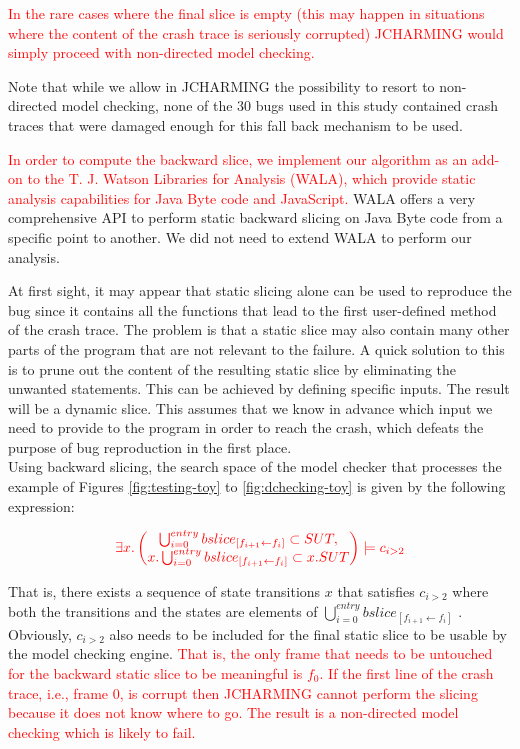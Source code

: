 \documentclass[times, doublespace]{smrauth}
\newcommand{\red}[1]{\textcolor{red}{#1}}
\begin{document}
{\red{In the rare cases where the final slice is empty (this
may happen in situations where the content of the crash trace
is seriously corrupted) JCHARMING would simply
proceed with non-directed model checking.}




Note that while we allow in JCHARMING the possibility to resort to non-directed
model
checking, none of the 30 bugs used in this study contained crash traces
that were damaged enough for this fall back mechanism to be used.

\red{In order to compute the backward slice, we implement our
algorithm as an add-on to the T. J. Watson
Libraries for Analysis (WALA)\cite{IBM2006}, which provide static
analysis capabilities for Java Byte code and JavaScript.}  WALA offers a very comprehensive API
to perform static backward slicing on Java Byte code from a
specific point to another.
We did not need to extend WALA to perform our
analysis.

At first sight, it may appear that static slicing alone can be
used to reproduce the bug since it contains all the functions
that lead to the first user-defined method of the crash trace.
The problem is that a static slice may also contain many other
parts of the program that are not relevant to the failure. A
quick solution to this is to prune out the content of the
resulting static slice by eliminating the unwanted statements.
This can be achieved by defining specific inputs. The result
will be a dynamic slice. This assumes that we know in
advance which input we need to provide to the program in
order to reach the crash, which defeats the purpose of bug
reproduction in the first place. \\


Using backward slicing, the search space of the model checker
that processes the example of Figures \ref{fig:testing-toy} to \ref{fig:dchecking-toy} is given by the
following expression:

\begin{equation}
  \red{
  \exists x.
  \begin{pmatrix}
    \bigcup_{i=0}^{entry} bslice_{[f_{i+1} \leftarrow f_i]}  \subset SUT, \\
    x.\bigcup_{i=0}^{entry} bslice_{[f_{i+1} \leftarrow f_i]}  \subset x.SUT
  \end{pmatrix}
  \models c_{i>2}
  }
\end{equation}

That is, there exists a sequence of state transitions $x$ that
satisfies $c_{i>2}$ where both the transitions and the states are
elements of $\bigcup_{i=0}^{entry} bslice_{[f_{i+1} \leftarrow f_i]}$ . Obviously, $c_{i>2}$ also
needs to be included for the final static slice to be usable by
the model checking engine. \red{That is, the only frame that
needs to be untouched for the backward static slice to be
meaningful is $f_0$.
If the first line of the crash trace, i.e., frame 0, is corrupt then JCHARMING cannot perform the slicing because  it does not know where to go. The result is a non-directed model checking which is likely to fail.}

}
\end{document}
